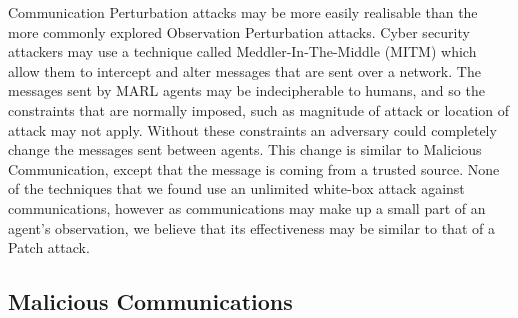 \documentclass[conference,compsoc]{IEEEtran}
\begin{document}
Communication Perturbation attacks may be more easily realisable than the more commonly explored Observation Perturbation attacks. Cyber security attackers may use a technique called Meddler-In-The-Middle (MITM) \cite{poddebniak_why_2021} which allow them to intercept and alter messages that are sent over a network. The messages sent by MARL agents may be indecipherable to humans, and so the constraints that are normally imposed, such as magnitude of attack or location of attack may not apply. Without these constraints an adversary could completely change the messages sent between agents. This change is similar to Malicious Communication, except that the message is coming from a trusted source. None of the techniques that we found use an unlimited white-box attack against communications, however as communications may make up a small part of an agent's observation, we believe that its effectiveness may be similar to that of a Patch attack. 

\subsection{Malicious Communications}
\end{document}

